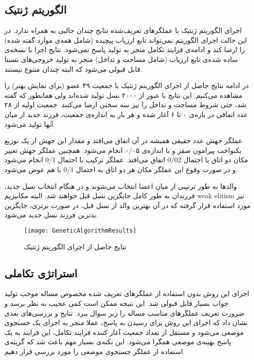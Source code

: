 \documentclass{report}
\begin{document}
\subsection{الگوریتم ژنتیک}
اجرای الگوریتم ژنتیک با عملگرهای تعریف‌شده نتایج چندان جالبی به همراه ندارد. در این حالت اجرای الگوریتم نمی‌تواند تابع ارزیاب پیچیده (شامل همه‌ی موارد گفته شده) را ارضا کند و ادامه‌ی فرایند تکامل منجر به تولید پاسخ نمی‌شود. نتایج اجرا با نسخه‌ی ساده شده‌ی تابع ارزیاب (شامل مساحت و تداخل) منجر به تولید خروجی‌های نسبتا قابل قبولی می‌شود که البته چندان متنوع نیستند.

در ادامه نتایج حاصل از اجرای الگوریتم ژنتیک با جمعیت ۴۹ عضو‌ (برای نمایش بهتر) را مشاهده می‌کنیم. این نتایج با عبور از ۲۰۰۰ نسل تولید شده‌اند ولی همانطور که گفته شد، حتی شروط مساحت و تداخل را نیز سه سختی ارضا می‌کنند. جمعیت اولیه از ۲۸ عدد اتفاقی در بازه‌ی ۰ تا ۶ آغاز شده و هر بار به اندازه‌ی جمعیت، فرزند جدید از میان آنها تولید می‌شود.

عملگر جهش عدد حقیقی همیشه در آن اتفاق می‌افتد و مقدار این جهش از یک توزیع یکنواخت پیرامون صفر و با اندازه‌ی ۰/۰۵ انجام می‌شود. همچنین عملگر جهش تغییر مکان دو اتاق با احتمال 0/02 اتفاق می‌افتد. عملگر ترکیب با احتمال 0/1 انجام می‌شود و در صورت وقوع این عملگر مکان هر دو اتاق به احتمال 0/1 با هم عوض می‌شود.

والدها به طور ترتیبی از میان اعضا انتخاب می‌شوند و در هنگام انتخاب نسل جدید، فرزندان به طور کامل جایگزین نسل قبل خواهند شد. البته مکانیزیم weak elitism نیز مورد استفاده قرار گرفته که در آن بهترین والد از نسل قبل، در صورت برتری، جایگزین بدترین فرزند نسل جدید می‌شود.

\begin{figure} \centerline{\texttt{[image: GeneticAlgorithmResults]}} \caption{\label{fGeneticAlgorithmResults}
نتایج حاصل از اجرای الگوریتم ژنتیک
} \end{figure}

\subsection{استراتژی تکاملی}
اجرای این روش بدون استفاده از عملگرهای تعریف شده مخصوص مساله موجب تولید جواب بسیار قابل قبولی شد. این نتیجه ممکن است کمی عجیب به نظر برسد و ضرورت تعریف عملگرهای مناسب مساله را زیر سوال ببرد. نتایج و بررسی‌های بعدی نشان داد که اجرای این روش برای رسیدن به پاسخ، عملا منجر به اجرای یک جستجوی موضعی می‌شود و مستقل از تعداد جمعیت آغاز کننده فرایند تکامل، این فرایند به یک پاسخ بهینه‌ی موضعی همگرا می‌شود. این نکته‌ی بسیار مهم باعث شد که گزینه‌ی استفاده از عملگر جستجوی موضعی را مورد بررسی قرار دهیم.
\end{document}
